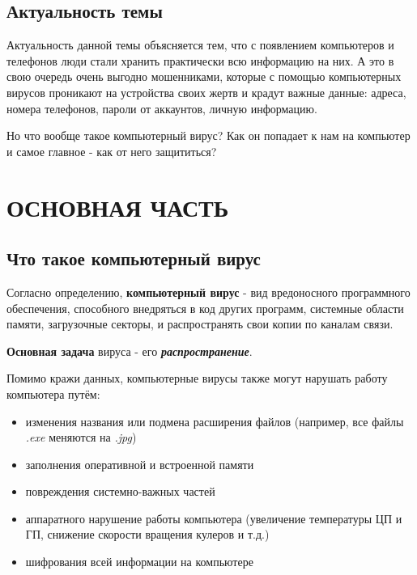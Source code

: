 \documentclass[12pt]{article}
\begin{document}
\newpage
\subsection*{Актуальность темы}

Актуальность данной темы объясняется тем, что с появлением компьютеров и телефонов люди стали хранить практически всю информацию на них. А это в свою очередь очень выгодно мошенниками, которые с помощью компьютерных вирусов проникают на устройства своих жертв и крадут важные данные: адреса, номера телефонов, пароли от аккаунтов, личную информацию.

Но что вообще такое компьютерный вирус? Как он попадает к нам на компьютер и самое главное - как от него защититься?

\section*{ОСНОВНАЯ ЧАСТЬ}
\subsection*{Что такое компьютерный вирус}

Согласно определению, \textbf{компьютерный вирус} - вид вредоносного программного обеспечения, способного внедряться в код других программ, системные области памяти, загрузочные секторы, и распространять свои копии по каналам связи.

\textbf{Основная задача} вируса - его \textbf{\textit{распространение}}.

Помимо кражи данных, компьютерные вирусы также могут нарушать работу компьютера путём:
\begin{itemize}
    \item изменения названия или подмена расширения файлов (например, все файлы \textit{.exe} меняются на \textit{.jpg})
    \item заполнения оперативной и встроенной памяти
    \item повреждения системно-важных частей
    \item аппаратного нарушение работы компьютера (увеличение температуры ЦП и ГП, снижение скорости вращения кулеров и т.д.)
    \item шифрования всей информации на компьютере
\end{itemize}
\end{document}
